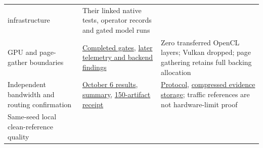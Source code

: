 \documentclass[10pt,a4paper]{article}
\begin{document}
\begin{longtable}[]{@{}lll@{}}
\begin{minipage}[t]{0.30\columnwidth}
{infrastructure}\strut
\end{minipage} & \begin{minipage}[t]{0.30\columnwidth}\raggedright
Their linked native tests, operator records and gated model runs\strut
\end{minipage}\tabularnewline
\begin{minipage}[t]{0.30\columnwidth}\raggedright
GPU and page-gather boundaries\strut
\end{minipage} & \begin{minipage}[t]{0.30\columnwidth}\raggedright
\href{https://github.com/MoyaMryia/riscv-accl/blob/main/spacemit/reports/2026-09-27-completed-gates.md}{Completed
gates},
\href{https://github.com/MoyaMryia/riscv-accl/blob/main/spacemit/reports/2026-09-27-resumed-measures.md}{later
telemetry and backend findings}\strut
\end{minipage} & \begin{minipage}[t]{0.30\columnwidth}\raggedright
Zero transferred OpenCL layers; Vulkan dropped; page gathering retains
full backing allocation\strut
\end{minipage}\tabularnewline
\begin{minipage}[t]{0.30\columnwidth}\raggedright
Independent bandwidth and routing confirmation\strut
\end{minipage} & \begin{minipage}[t]{0.30\columnwidth}\raggedright
\href{https://github.com/MoyaMryia/riscv-accl/blob/main/spacemit/reports/2026-10-06-k1-roofline-results.md}{October
6 results},
\href{https://github.com/MoyaMryia/riscv-accl/blob/main/spacemit/reports/raw/k1-roofline-20261005-225502/summary.json}{summary},
\href{https://github.com/MoyaMryia/riscv-accl/blob/main/spacemit/reports/raw/k1-roofline-20261005-225502/collection-receipt.json}{150-artifact
receipt}\strut
\end{minipage} & \begin{minipage}[t]{0.30\columnwidth}\raggedright
\href{https://github.com/MoyaMryia/riscv-accl/blob/main/spacemit/experiments/2026-10-05-k1-roofline.md}{Protocol},
\href{https://github.com/MoyaMryia/riscv-accl/blob/main/spacemit/reports/raw/k1-roofline-20261005-225502/ARCHIVE.md}{compressed
evidence storage}; traffic references are not hardware-limit proof\strut
\end{minipage}\tabularnewline
\begin{minipage}[t]{0.30\columnwidth}\raggedright
Same-seed local clean-reference quality\strut
\end{minipage} & \begin{minipage}[t]{0.30\columnwidth}\raggedright

\end{minipage}
\end{longtable}
\end{document}
